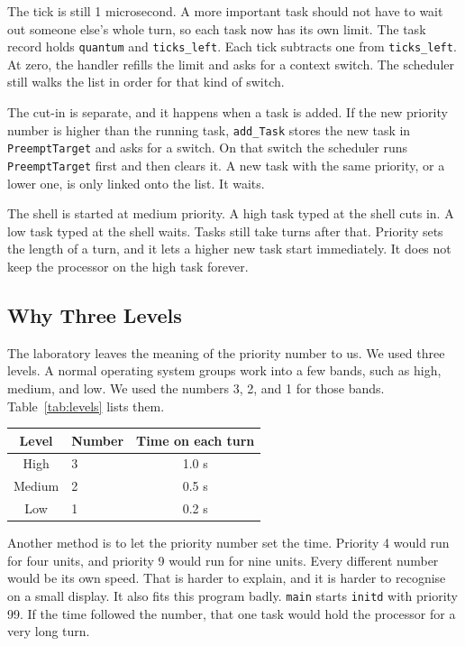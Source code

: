 \documentclass[conference,a4paper]{IEEEtran}
\begin{document}
The tick is still 1 microsecond. A more important task should not have to wait out someone else's whole turn, so each task now has its own limit. The task record holds \texttt{quantum} and \texttt{ticks\_left}. Each tick subtracts one from \texttt{ticks\_left}. At zero, the handler refills the limit and asks for a context switch. The scheduler still walks the list in order for that kind of switch.

The cut-in is separate, and it happens when a task is added. If the new priority number is higher than the running task, \texttt{add\_Task} stores the new task in \texttt{PreemptTarget} and asks for a switch. On that switch the scheduler runs \texttt{PreemptTarget} first and then clears it. A new task with the same priority, or a lower one, is only linked onto the list. It waits.

The shell is started at medium priority. A high task typed at the shell cuts in. A low task typed at the shell waits. Tasks still take turns after that. Priority sets the length of a turn, and it lets a higher new task start immediately. It does not keep the processor on the high task forever.

\subsection{Why Three Levels}

The laboratory leaves the meaning of the priority number to us. We used three levels. A normal operating system groups work into a few bands, such as high, medium, and low. We used the numbers 3, 2, and 1 for those bands. Table~\ref{tab:levels} lists them.

\begin{center}
\label{tab:levels}
\begin{tabular}{clc}
\toprule
Level & Number & Time on each turn \\
\midrule
High & 3 & 1.0 s \\
Medium & 2 & 0.5 s \\
Low & 1 & 0.2 s \\
\bottomrule
\end{tabular}
\end{center}

Another method is to let the priority number set the time. Priority 4 would run for four units, and priority 9 would run for nine units. Every different number would be its own speed. That is harder to explain, and it is harder to recognise on a small display. It also fits this program badly. \texttt{main} starts \texttt{initd} with priority 99. If the time followed the number, that one task would hold the processor for a very long turn.
\end{document}
